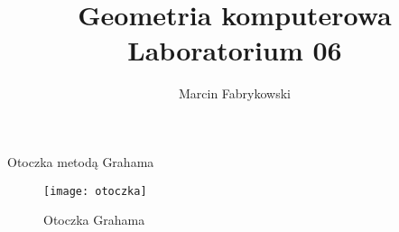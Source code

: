 \documentclass[a4paper, 12pt]{article}
\author{Marcin Fabrykowski}
\title{Geometria komputerowa\\Laboratorium 06}
\begin{document}
\maketitle
\newpage
Otoczka metodą Grahama

\begin{figure}
\texttt{[image: otoczka]}
\caption{Otoczka Grahama}
\end{figure}
\end{document}
